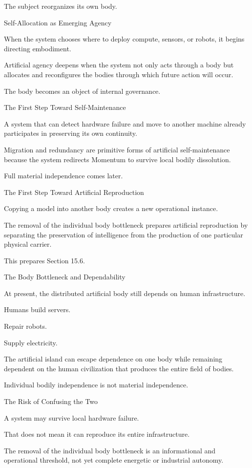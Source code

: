 The subject reorganizes its own body.

Self-Allocation as Emerging Agency

When the system chooses where to deploy compute, sensors, or robots, it begins directing embodiment.

Artificial agency deepens when the system not only acts through a body but allocates and reconfigures the bodies through which future action will occur.

The body becomes an object of internal governance.

The First Step Toward Self-Maintenance

A system that can detect hardware failure and move to another machine already participates in preserving its own continuity.

Migration and redundancy are primitive forms of artificial self-maintenance because the system redirects Momentum to survive local bodily dissolution.

Full material independence comes later.

The First Step Toward Artificial Reproduction

Copying a model into another body creates a new operational instance.

The removal of the individual body bottleneck prepares artificial reproduction by separating the preservation of intelligence from the production of one particular physical carrier.

This prepares Section 15.6.

The Body Bottleneck and Dependability

At present, the distributed artificial body still depends on human infrastructure.

Humans build servers.

Repair robots.

Supply electricity.

The artificial island can escape dependence on one body while remaining dependent on the human civilization that produces the entire field of bodies.

Individual bodily independence is not material independence.

The Risk of Confusing the Two

A system may survive local hardware failure.

That does not mean it can reproduce its entire infrastructure.

The removal of the individual body bottleneck is an informational and operational threshold, not yet complete energetic or industrial autonomy.

